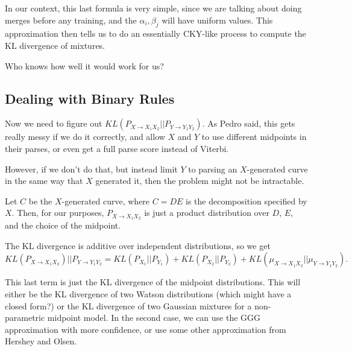 In our context, this last formula is very simple, since we are talking
about doing merges before any training, and the $\alpha_i, \beta_j$
will have uniform values. This approximation then tells us to do an
essentially CKY-like process to compute the KL divergence of mixtures.

Who knows how well it would work for us?

\subsection{Dealing with Binary Rules}

Now we need to figure out $KL( P_{X\to X_1 X_2} || P_{Y \to Y_1
  Y_2})$. As Pedro said, this gets really messy if we do it correctly,
and allow $X$ and $Y$ to use different midpoints in their parses, or
even get a full parse score instead of Viterbi.

However, if we don't do that, but instead limit $Y$ to parsing an
$X$-generated curve in the same way that $X$ generated it, then the
problem might not be intractable.

Let $C$ be the $X$-generated curve, where $C=DE$ is the decomposition
specified by $X$. Then, for our purposes, $P_{X\to X_1 X_2}$ is just a
product distribution over $D$, $E$, and the choice of the midpoint.

The KL divergence is additive over independent distributions, so we get
$$KL(P_{X\to X_1 X_2}) || P_{Y\to Y_1 Y_2} = KL(P_{X_1} || P_{Y_1}) +
KL(P_{X_2} || P_{Y_2}) + KL(\mu_{X\to X_1 X_2} || \mu_{Y\to Y_1
  Y_2}).$$

This last term is just the KL divergence of the midpoint
distributions. This will either be the KL divergence of two Watson
distributions (which might have a closed form?) or the KL divergence
of two Gaussian mixtures for a non-parametric midpoint model. In the
second case, we can use the GGG approximation with more confidence, or
use some other approximation from Hershey and Olsen.

